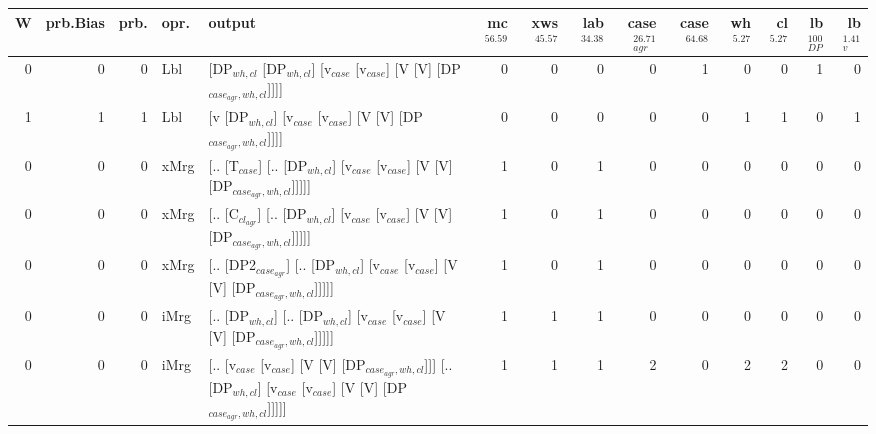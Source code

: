 \begin{tabularx}{\linewidth}{rrrlXrrrrrrrrr}
\hline
   W &   prb.Bias &   prb. & opr.   & output                                                                                                           &   mc$^{56.59}$ &   xws$^{45.57}$ &   lab$^{34.38}$ &   case$_{agr}^{26.71}$ &   case$^{64.68}$ &   wh$^{5.27}$ &   cl$^{5.27}$ &   lb$_{DP}^{100}$ &   lb$_{v}^{1.41}$ \\
\hline
   0 &       0 &   0 & Lbl  & [DP$_{wh,cl}$ [DP$_{wh,cl}$] [v$_{case}$ [v$_{case}$] [V [V] [DP$_{case_{agr},wh,cl}$]]]]                                              &            0 &             0 &             0 &                  0 &              1 &           0 &           0 &                1 &             0 \\
   1 &       1 &   1 & Lbl  & [v [DP$_{wh,cl}$] [v$_{case}$ [v$_{case}$] [V [V] [DP$_{case_{agr},wh,cl}$]]]]                                                     &            0 &             0 &             0 &                  0 &              0 &           1 &           1 &                0 &             1 \\
   0 &       0 &   0 & xMrg & [.. [T$_{case}$] [.. [DP$_{wh,cl}$] [v$_{case}$ [v$_{case}$] [V [V] [DP$_{case_{agr},wh,cl}$]]]]]                                      &            1 &             0 &             1 &                  0 &              0 &           0 &           0 &                0 &             0 \\
   0 &       0 &   0 & xMrg & [.. [C$_{cl_{agr}}$] [.. [DP$_{wh,cl}$] [v$_{case}$ [v$_{case}$] [V [V] [DP$_{case_{agr},wh,cl}$]]]]]                                    &            1 &             0 &             1 &                  0 &              0 &           0 &           0 &                0 &             0 \\
   0 &       0 &   0 & xMrg & [.. [DP2$_{case_{agr}}$] [.. [DP$_{wh,cl}$] [v$_{case}$ [v$_{case}$] [V [V] [DP$_{case_{agr},wh,cl}$]]]]]                                &            1 &             0 &             1 &                  0 &              0 &           0 &           0 &                0 &             0 \\
   0 &       0 &   0 & iMrg & [.. [DP$_{wh,cl}$] [.. [DP$_{wh,cl}$] [v$_{case}$ [v$_{case}$] [V [V] [DP$_{case_{agr},wh,cl}$]]]]]                                    &            1 &             1 &             1 &                  0 &              0 &           0 &           0 &                0 &             0 \\
   0 &       0 &   0 & iMrg & [.. [v$_{case}$ [v$_{case}$] [V [V] [DP$_{case_{agr},wh,cl}$]]] [.. [DP$_{wh,cl}$] [v$_{case}$ [v$_{case}$] [V [V] [DP$_{case_{agr},wh,cl}$]]]]] &            1 &             1 &             1 &                  2 &              0 &           2 &           2 &                0 &             0 \\

\end{tabularx}
